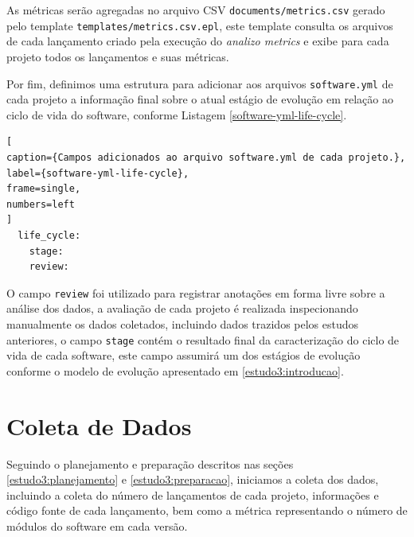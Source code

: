 As métricas serão agregadas no arquivo CSV \texttt{documents/metrics.csv}
gerado pelo template \texttt{templates/metrics.csv.epl}, este template consulta
os arquivos de cada lançamento criado pela execução do {\it analizo metrics}
e exibe para cada projeto todos os lançamentos e suas métricas.

Por fim, definimos uma estrutura para adicionar aos arquivos \texttt{software.yml} de
cada projeto a informação final sobre o atual estágio de evolução em relação ao
ciclo de vida do software, conforme Listagem \ref{software-yml-life-cycle}.

\begin{lstlisting}[
caption={Campos adicionados ao arquivo software.yml de cada projeto.},
label={software-yml-life-cycle},
frame=single,
numbers=left
]
  life_cycle:
    stage:
    review:
\end{lstlisting}

O campo \texttt{review} foi utilizado para registrar anotações em forma livre
sobre a análise dos dados, a avaliação de cada projeto é realizada
inspecionando manualmente os dados coletados, incluindo dados trazidos pelos
estudos anteriores, o campo \texttt{stage} contém o resultado final da
caracterização do ciclo de vida de cada software, este campo assumirá um dos
estágios de evolução conforme o modelo de evolução apresentado em
\ref{estudo3:introducao}.




\section{Coleta de Dados} \label{estudo3:coleta} %

Seguindo o planejamento e preparação descritos nas seções
\ref{estudo3:planejamento} e \ref{estudo3:preparacao}, iniciamos a coleta dos
dados, incluindo a coleta do número de lançamentos de cada projeto, informações
e código fonte de cada lançamento, bem como a métrica representando o número de
módulos do software em cada versão.

